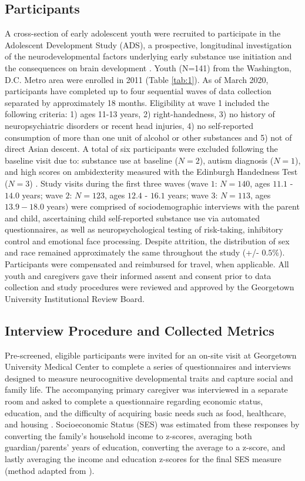 \documentclass[utf8]{stylesheet}
\begin{document}
\subsection{Participants} 
A cross-section of early adolescent youth were recruited to participate in the Adolescent Development Study (ADS), a prospective, longitudinal investigation of the neurodevelopmental factors underlying early substance use initiation and the consequences on brain development \citep{Fishbein2016}. Youth (N=141) from the Washington, D.C. Metro area were enrolled in 2011 (Table \ref{tab:1}). As of March 2020, participants have completed up to four sequential waves of data collection separated by approximately 18 months. Eligibility at wave 1 included the following criteria: 1) ages 11-13 years, 2) right-handedness, 3) no history of neuropsychiatric disorders or recent head injuries, 4) no self-reported consumption of more than one unit of alcohol or other substances and 5) not of direct Asian descent. A total of six participants were excluded following the baseline visit due to: substance use at baseline ($N=2$), autism diagnosis ($N=1$), and high scores on ambidexterity measured with the Edinburgh Handedness Test ($N=3$) \citep{veale2014edinburgh}. Study visits during the first three waves (wave $1$: $N=140$, ages $11.1$ - $14.0$ years; wave $2$:  $N=123$, ages $12.4$ - $16.1$ years; wave $3$: $N=113$, ages $13.9 - 18.0$ years) were comprised of sociodemographic interviews with the parent and child, ascertaining child self-reported substance use via automated questionnaires, as well as neuropsychological testing of risk-taking, inhibitory control and emotional face processing. Despite attrition, the distribution of sex and race remained approximately the same throughout the study (+/- $0.5\%$). Participants were compensated and reimbursed for travel, when applicable. All youth and caregivers gave their informed assent and consent prior to data collection and study procedures were reviewed and approved by the Georgetown University Institutional Review Board. 
\subsection{Interview Procedure and Collected Metrics} Pre-screened, eligible participants were invited for an on-site visit at Georgetown University Medical Center to complete a series of questionnaires and interviews designed to measure neurocognitive developmental traits and capture social and family life. The accompanying primary caregiver was interviewed in a separate room and asked to complete a questionnaire regarding economic status, education, and the difficulty of acquiring basic needs such as food, healthcare, and housing \citep{bornstein2003socioeconomic}. Socioeconomic Status (SES) was estimated from these responses by converting the family’s household income to z-scores, averaging both guardian/parents' years of education, converting the average to a z-score, and lastly averaging the income and education z-scores for the final SES measure (method adapted from \cite{manuck2010ses}).
\end{document}
